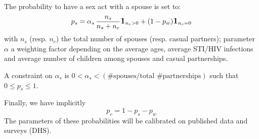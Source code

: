 \documentclass[11pt, onecolumn]{article}
\newcommand{\one}[1]{\textbf{\large{1}}_{#1}}
\newcommand{\warning}[1]{\textbf{\textcolor{OrangeRed}{#1}}}
\begin{document}
The probability to have a sex act with a spouse is set to:
$$p_s = \alpha_s \,\frac{n_s}{n_s+n_c} \one{n_c>0} + (1-p_w)\one{n_c=0}$$
with $n_s$ (resp. $n_c$) the total number of spouses (resp. casual partners); parameter $\alpha$ a weighting factor depending on the average ages, average STI/HIV infections and average number of children among spouses and casual partnerships.
%
%
%
%
%

A constraint on $\alpha_s$ is $0<\alpha_s<(\text{\# spouses} / \text{total \# partnerships})$ such that $0\leq p_s \leq 1$. 


 Finally, we have implicitly
$$p_c = 1-p_s-p_w$$
The parameters of these probabilities will be calibrated on published data and surveys (DHS).
\end{document}
